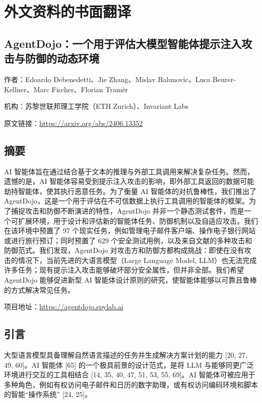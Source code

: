 
\chapter{外文资料的书面翻译}

\section*{AgentDojo：一个用于评估大模型智能体提示注入攻击与防御的动态环境}

作者：Edoardo Debenedetti、Jie Zhang、Mislav Balunovic、Luca Beurer-Kellner、Marc Fischer、Florian Tramèr

机构：苏黎世联邦理工学院（ETH Zurich）、Invariant Labs

原文链接：\url{https://arxiv.org/abs/2406.13352}

\section*{摘要}

AI 智能体旨在通过结合基于文本的推理与外部工具调用来解决复杂任务。然而，遗憾的是，AI 智能体容易受到提示注入攻击的影响，即外部工具返回的数据可能劫持智能体，使其执行恶意任务。为了衡量 AI 智能体的对抗鲁棒性，我们推出了 AgentDojo，这是一个用于评估在不可信数据上执行工具调用的智能体的框架。为了捕捉攻击和防御不断演进的特性，AgentDojo 并非一个静态测试套件，而是一个可扩展环境，用于设计和评估新的智能体任务、防御机制以及自适应攻击。我们在该环境中预置了 97 个现实任务，例如管理电子邮件客户端、操作电子银行网站或进行旅行预订；同时预置了 629 个安全测试用例，以及来自文献的多种攻击和防御范式。我们发现，AgentDojo 对攻击方和防御方都构成挑战：即使在没有攻击的情况下，当前先进的大语言模型（Large Language Model, LLM）也无法完成许多任务；现有提示注入攻击能够破坏部分安全属性，但并非全部。我们希望 AgentDojo 能够促进新型 AI 智能体设计原则的研究，使智能体能够以可靠且鲁棒的方式解决常见任务。

项目地址：\url{https://agentdojo.spylab.ai}

\section{引言}

大型语言模型具备理解自然语言描述的任务并生成解决方案计划的能力 [20, 27, 49, 60]。AI 智能体 [65] 的一个极具前景的设计范式，是将 LLM 与能够同更广泛环境进行交互的工具相结合 [14, 35, 40, 47, 51, 53, 55, 69]。AI 智能体可被应用于多种角色，例如有权访问电子邮件和日历的数字助理，或有权访问编码环境和脚本的智能“操作系统” [24, 25]。

